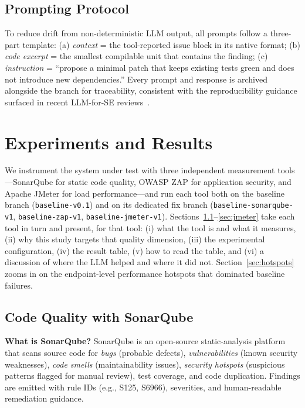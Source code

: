 \documentclass[conference]{IEEEtran}
\begin{document}
\subsection{Prompting Protocol}\label{sec:prompting}
To reduce drift from non-deterministic LLM output, all prompts follow a three-part template: (a) \emph{context} = the tool-reported issue block in its native format; (b) \emph{code excerpt} = the smallest compilable unit that contains the finding; (c) \emph{instruction} = ``propose a minimal patch that keeps existing tests green and does not introduce new dependencies.'' Every prompt and response is archived alongside the branch for traceability, consistent with the reproducibility guidance surfaced in recent LLM-for-SE reviews~\cite{ref14}.

\section{Experiments and Results}
We instrument the system under test with three independent measurement tools---SonarQube for static code quality, OWASP ZAP for application security, and Apache JMeter for load performance---and run each tool both on the baseline branch (\texttt{baseline-v0.1}) and on its dedicated fix branch (\texttt{baseline-sonarqube-v1}, \texttt{baseline-zap-v1}, \texttt{baseline-jmeter-v1}). Sections~\ref{sec:sonar}--\ref{sec:jmeter} take each tool in turn and present, for that tool: (i) what the tool is and what it measures, (ii) why this study targets that quality dimension, (iii) the experimental configuration, (iv) the result table, (v) how to read the table, and (vi) a discussion of where the LLM helped and where it did not. Section~\ref{sec:hotspots} zooms in on the endpoint-level performance hotspots that dominated baseline failures.

\subsection{Code Quality with SonarQube}\label{sec:sonar}
\textbf{What is SonarQube?} SonarQube is an open-source static-analysis platform that scans source code for \emph{bugs} (probable defects), \emph{vulnerabilities} (known security weaknesses), \emph{code smells} (maintainability issues), \emph{security hotspots} (suspicious patterns flagged for manual review), test coverage, and code duplication. Findings are emitted with rule IDs (e.g., \textsc{S125}, \textsc{S6966}), severities, and human-readable remediation guidance.
\end{document}
